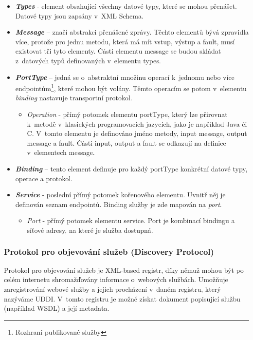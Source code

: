 \documentclass[11pt,twoside,a4paper]{book}
\begin{document}
\begin{itemize}
  \item \textbf{\textit{Types}} - element obsahující všechny datové typy,
  které se mohou přenášet. Datové typy jsou zapsány v~XML Schema.

  \item \textbf{\textit{Message}} – značí abstrakci přenášené zprávy.
  Těchto elementů bývá zpravidla více, protože pro jednu metodu, která má mít
  vstup, výstup a fault, musí existovat tři tyto
elementy. Části elementu message se budou skládat z~datových typů definovaných
v~elementu types.

  \item \textbf{\textit{PortType}} – jedná se o~abstraktní množinu operací
k~jednomu nebo více endpointům\footnote{Rozhraní publikované služby}, které
  mohou být volány.
  Těmto operacím se potom v~elementu \textit{binding} nastavuje transportní protokol.

  \begin{itemize}
    \item \textit{Operation} - přímý potomek elementu portType,
    který lze přirovnat k~metodě v~klasických programovacích jazycích, jako je
    například Java či C. V~tomto elementu je definováno jméno metody, input message, output message a fault.
Části input, output a fault se odkazují na definice v~elementech message.

  \end{itemize}
  \item \textbf{\textit{Binding}} – tento element definuje pro každý
  portType konkrétní datové typy, operace a protokol.

  \item \textbf{\textit{Service}} - poslední přímý potomek kořenového
  elementu. Uvnitř něj je definován seznam endpointů. Binding služby je zde
  mapován na \textit{port}.

  \begin{itemize}
    \item \textit{Port} - přímý potomek elementu service. Port je
    kombinací bindingu a síťové adresy, na které je služba dostupná.

  \end{itemize}
\end{itemize}

\subsubsection{Protokol pro objevování služeb (Discovery Protocol)}
Protokol pro objevování služeb je XML-based registr, díky němuž mohou být po celém
internetu shromažďovány informace o~webových službách. Umožňuje zaregistrování webové
služby a jejich procházení v~daném registru, který nazýváme UDDI. V~tomto registru je
možné získat dokument popisující službu (například WSDL) a její metadata.
\end{document}

